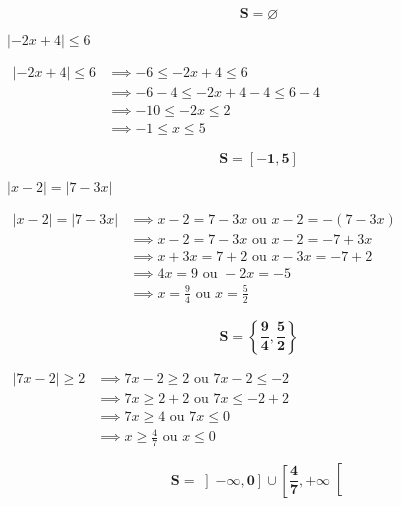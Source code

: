 \documentclass[12pt,a4paper]{article}
\begin{document}
\begin{enumerate}
\begin{tcolorbox}[colback=yellow!20, colframe=black, sharp corners]
    \[
    \mathbf{S = \varnothing}
    \]
\end{tcolorbox}

\( |-2x + 4| \leq 6 \)

\(
\begin{aligned}
|-2x + 4| \leq 6 &\implies -6 \leq -2x + 4 \leq 6\\
								 &\implies -6 - 4 \leq -2x + 4 - 4 \leq 6 - 4\\
								 &\implies -10 \leq -2x \leq 2 \\
								 &\implies -1 \leq x \leq 5
\end{aligned}
\)

\begin{tcolorbox}[colback=yellow!20, colframe=black, sharp corners]
    \[
    \mathbf{S = [-1, 5]}
    \]
\end{tcolorbox}

\( |x - 2| = |7 - 3x| \)

\(
\begin{aligned}
|x - 2| = |7 - 3x| &\implies x - 2 = 7 - 3x \text{ ou } x - 2 = - (7 - 3x) \\
									 &\implies x - 2 = 7 - 3x \text{ ou } x - 2 = -7 + 3x \\
									 &\implies x + 3x = 7 + 2 \text{ ou } x - 3x = -7 + 2 \\
									 &\implies 4x = 9 \text{ ou } -2x = -5 \\
									 &\implies x = \frac{9}{4} \text{ ou } x = \frac{5}{2}
\end{aligned}
\)

\begin{tcolorbox}[colback=yellow!20, colframe=black, sharp corners]
    \[
    \mathbf{S = \left\{ \frac{9}{4}, \frac{5}{2} \right\}}
    \]
\end{tcolorbox}

\bigskip

\(
\begin{aligned}
|7x - 2| \geq 2 &\implies 7x - 2 \geq 2 \text{ ou } 7x - 2 \leq -2 \\
                &\implies 7x \geq 2 + 2 \text{ ou } 7x \leq -2 + 2 \\
                &\implies 7x \geq 4 \text{ ou } 7x \leq 0 \\
                &\implies x \geq \frac{4}{7} \text{ ou } x \leq 0
\end{aligned}
\)
\begin{tcolorbox}[colback=yellow!20, colframe=black, sharp corners]
    \[
    \mathbf{S = \left] -\infty, 0 \right] \cup \left[ \frac{4}{7}, +\infty \right[}
    \]
\end{tcolorbox}
\end{enumerate}
\end{document}
